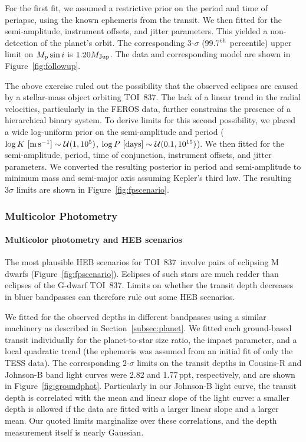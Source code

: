 \documentclass[12pt,twocolumn,tighten]{aastex63}
\newcommand{\tn}{TOI~837} %
\begin{document}
For the first fit, we assumed a restrictive prior on the period and
time of periapse, using the known ephemeris from the transit.  We then
fitted for the semi-amplitude, instrument offsets, and jitter
parameters.  This yielded a non-detection of the planet's orbit.  The
corresponding 3-$\sigma$ (99.7$^{\rm th}$ percentile) upper limit on
$M_{\rm p} \sin i$ is $1.20 M_{\rm Jup}$.  The data and corresponding
model are shown in Figure~\ref{fig:followup}.

The above exercise ruled out the possibility that the observed
eclipses are caused by a stellar-mass object orbiting \tn.  The lack
of a linear trend in the radial velocities, particularly in the FEROS
data, further constrains the presence of a hierarchical binary system.
To derive limits for this second possibility, we placed a wide
log-uniform prior on the semi-amplitude and period ($\log K\ [{\rm
m\,s^{-1}}] \sim \mathcal{U}(1,10^5)$, $\log P\ [{\rm days}] \sim
\mathcal{U}(0.1, 10^{15})$).  We then fitted for the semi-amplitude,
period, time of conjunction, instrument offsets, and jitter
parameters.  We converted the resulting posterior in period and
semi-amplitude to minimum mass and semi-major axis assuming Kepler's
third law.  The resulting $3\sigma$ limits are shown in
Figure~\ref{fig:fpscenario}.

\subsubsection{Multicolor Photometry}
\label{subsec:colorphot}

\paragraph{Multicolor photometry and HEB scenarios}
The most plausible HEB scenarios for \tn\ involve pairs of eclipsing M
dwarfs (Figure~\ref{fig:fpscenario}).  Eclipses of such stars are much
redder than eclipses of the G-dwarf \tn.  Limits on whether the
transit depth decreases in bluer bandpasses can therefore rule out
some HEB scenarios.

We fitted for the observed depths in different bandpasses using a
similar machinery as described in Section~\ref{subsec:planet}.  We
fitted each ground-based transit individually for the planet-to-star
size ratio, the impact parameter, and a local quadratic trend (the
ephemeris was assumed from an initial fit of only the TESS data).  The
corresponding $2$-$\sigma$ limits on the transit depths in Cousins-R
and Johnson-B band light curves were 2.82 and 1.77$\,$ppt,
respectively, and are shown in Figure~\ref{fig:groundphot}.
Particularly in our Johnson-B light curve, the transit depth is
correlated with the mean and linear slope of the light curve: a
smaller depth is allowed if the data are fitted with a larger linear
slope and a larger mean.  Our quoted limits marginalize over these
correlations, and the depth measurement itself is nearly Gaussian.
\end{document}
